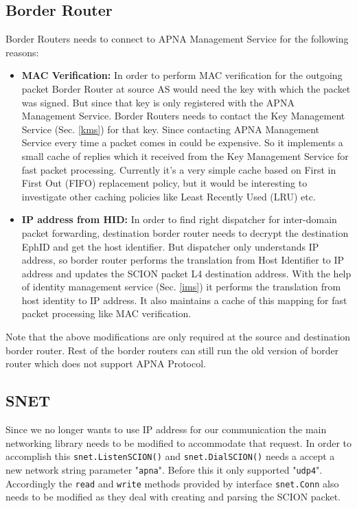 \subsection{Border Router}
Border Routers needs to connect to APNA Management Service for the following reasons:
\begin{itemize}
    \item \textbf{MAC Verification:} In order to perform MAC verification for the outgoing packet Border Router at source AS would need the key with which the packet was signed. But since that key is only registered with the APNA Management Service. Border Routers needs to contact the Key Management Service (Sec. \ref{kms}) for that key. Since contacting APNA Management Service every time a packet comes in could be expensive. So it implements a small cache of replies which it received from the Key Management Service for fast packet processing. Currently it's a very simple cache based on First in First Out (FIFO) replacement policy, but it would be interesting to investigate other caching policies like Least Recently Used (LRU) etc.
    \item \textbf{IP address from HID:} In order to find right dispatcher for inter-domain packet forwarding, destination border router needs to decrypt the destination EphID and get the host identifier. But dispatcher only understands IP address, so border router performs the translation from Host Identifier to IP address and updates the SCION packet L4 destination address. With the help of identity management service (Sec. \ref{ims}) it performs the translation from host identity to IP address. It also maintains a cache of this mapping for fast packet processing like MAC verification.
\end{itemize}
Note that the above modifications are only required at the source and destination border router. Rest of the border routers can still run the old version of border router which does not support APNA Protocol.

\subsection{SNET}
Since we no longer wants to use IP address for our communication the main networking library needs to be modified to accommodate that request. In order to accomplish this \texttt{snet.ListenSCION()} and \texttt{snet.DialSCION()} needs a accept a new network string parameter "\texttt{apna}". Before this it only supported "\texttt{udp4}". Accordingly the \texttt{read} and \texttt{write} methods provided by interface \texttt{snet.Conn} also needs to be modified as they deal with creating and parsing the SCION packet.

